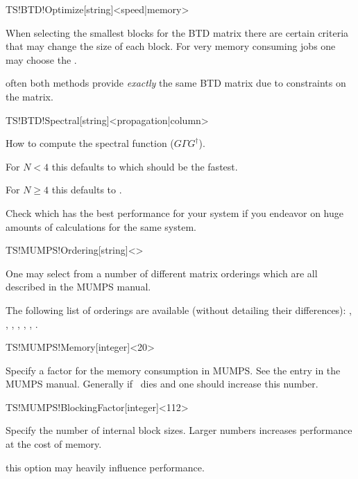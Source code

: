 \begin{fdfentry}{TS!BTD!Optimize}[string]<speed|memory>

  When selecting the smallest blocks for the BTD matrix there are
  certain criteria that may change the size of each block. For very
  memory consuming jobs one may choose the . 

  \note often both methods provide \emph{exactly} the same BTD matrix
  due to constraints on the matrix.
  
\end{fdfentry}

\begin{fdfentry}{TS!BTD!Spectral}[string]<propagation|column>

  How to compute the spectral function ($G\Gamma G^\dagger$). 

  For $N<4$ this defaults to  which should be the
  fastest.

  For $N\ge4$ this defaults to .

  Check which has the best performance for your system if you endeavor
  on huge amounts of calculations for the same system.

\end{fdfentry}


\begin{fdfentry}{TS!MUMPS!Ordering}[string]<>

  One may select from a number of different matrix orderings which are
  all described in the MUMPS manual. 

  The following list of orderings are available (without detailing
  their differences): %
  , , , , ,
  , .
  
\end{fdfentry}

\begin{fdfentry}{TS!MUMPS!Memory}[integer]<20>

  Specify a factor for the memory consumption in MUMPS. See the
   entry in the MUMPS manual. Generally if \tsiesta\
  dies and  one should increase this number.
  
\end{fdfentry}

\begin{fdfentry}{TS!MUMPS!BlockingFactor}[integer]<112>

  Specify the number of internal block sizes. Larger numbers increases
  performance at the cost of memory.
  
  \note this option may heavily influence performance.

\end{fdfentry}

